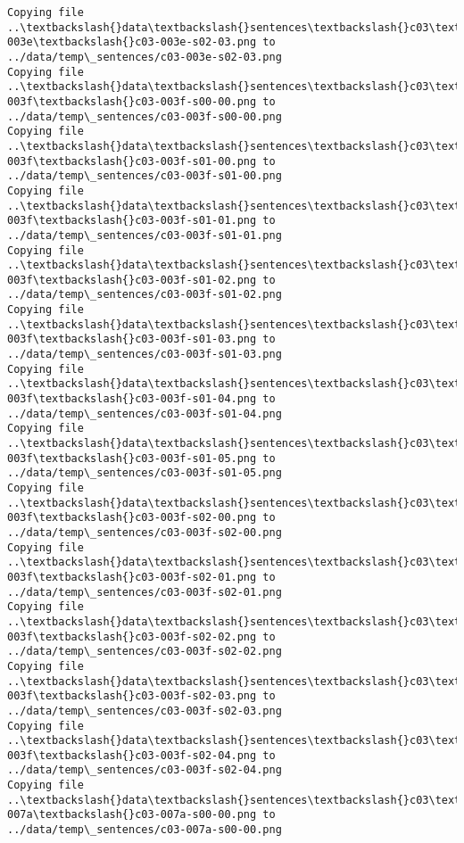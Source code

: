 \documentclass[11pt]{article}
\begin{document}
\begin{Verbatim}[commandchars=\\\{\}]
Copying file ..\textbackslash{}data\textbackslash{}sentences\textbackslash{}c03\textbackslash{}c03-003e\textbackslash{}c03-003e-s02-03.png to
../data/temp\_sentences/c03-003e-s02-03.png
Copying file ..\textbackslash{}data\textbackslash{}sentences\textbackslash{}c03\textbackslash{}c03-003f\textbackslash{}c03-003f-s00-00.png to
../data/temp\_sentences/c03-003f-s00-00.png
Copying file ..\textbackslash{}data\textbackslash{}sentences\textbackslash{}c03\textbackslash{}c03-003f\textbackslash{}c03-003f-s01-00.png to
../data/temp\_sentences/c03-003f-s01-00.png
Copying file ..\textbackslash{}data\textbackslash{}sentences\textbackslash{}c03\textbackslash{}c03-003f\textbackslash{}c03-003f-s01-01.png to
../data/temp\_sentences/c03-003f-s01-01.png
Copying file ..\textbackslash{}data\textbackslash{}sentences\textbackslash{}c03\textbackslash{}c03-003f\textbackslash{}c03-003f-s01-02.png to
../data/temp\_sentences/c03-003f-s01-02.png
Copying file ..\textbackslash{}data\textbackslash{}sentences\textbackslash{}c03\textbackslash{}c03-003f\textbackslash{}c03-003f-s01-03.png to
../data/temp\_sentences/c03-003f-s01-03.png
Copying file ..\textbackslash{}data\textbackslash{}sentences\textbackslash{}c03\textbackslash{}c03-003f\textbackslash{}c03-003f-s01-04.png to
../data/temp\_sentences/c03-003f-s01-04.png
Copying file ..\textbackslash{}data\textbackslash{}sentences\textbackslash{}c03\textbackslash{}c03-003f\textbackslash{}c03-003f-s01-05.png to
../data/temp\_sentences/c03-003f-s01-05.png
Copying file ..\textbackslash{}data\textbackslash{}sentences\textbackslash{}c03\textbackslash{}c03-003f\textbackslash{}c03-003f-s02-00.png to
../data/temp\_sentences/c03-003f-s02-00.png
Copying file ..\textbackslash{}data\textbackslash{}sentences\textbackslash{}c03\textbackslash{}c03-003f\textbackslash{}c03-003f-s02-01.png to
../data/temp\_sentences/c03-003f-s02-01.png
Copying file ..\textbackslash{}data\textbackslash{}sentences\textbackslash{}c03\textbackslash{}c03-003f\textbackslash{}c03-003f-s02-02.png to
../data/temp\_sentences/c03-003f-s02-02.png
Copying file ..\textbackslash{}data\textbackslash{}sentences\textbackslash{}c03\textbackslash{}c03-003f\textbackslash{}c03-003f-s02-03.png to
../data/temp\_sentences/c03-003f-s02-03.png
Copying file ..\textbackslash{}data\textbackslash{}sentences\textbackslash{}c03\textbackslash{}c03-003f\textbackslash{}c03-003f-s02-04.png to
../data/temp\_sentences/c03-003f-s02-04.png
Copying file ..\textbackslash{}data\textbackslash{}sentences\textbackslash{}c03\textbackslash{}c03-007a\textbackslash{}c03-007a-s00-00.png to
../data/temp\_sentences/c03-007a-s00-00.png

\end{Verbatim}
\end{document}
